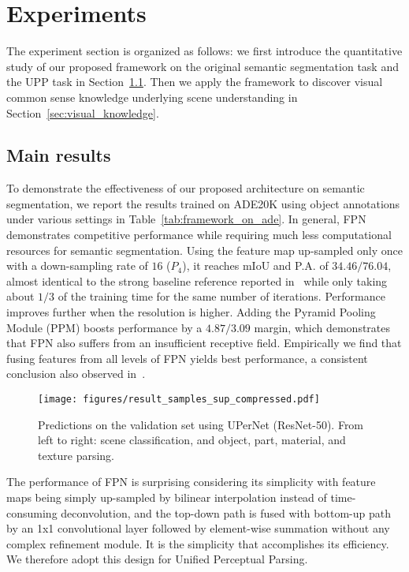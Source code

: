 \documentclass[runningheads]{llncs}
\begin{document}
\section{Experiments}
The experiment section is organized as follows: we first introduce the quantitative study of our proposed framework on the original semantic segmentation task and the UPP task in Section~\ref{sec:results}. Then we apply the framework to discover visual common sense knowledge underlying scene understanding in Section~\ref{sec:visual_knowledge}. 

\subsection{Main results}
\label{sec:results}

 To demonstrate the effectiveness of our proposed architecture on semantic segmentation, we report the results trained on ADE20K using object annotations under various settings in Table~\ref{tab:framework_on_ade}. In general, FPN demonstrates competitive performance while requiring much less computational resources for semantic segmentation. Using the feature map up-sampled only once with a down-sampling rate of $16$ ($P_4$), it reaches mIoU and P.A. of $34.46/76.04$, almost identical to the strong baseline reference reported in~\cite{zhao2017pyramid} while only taking about $1/3$ of the training time for the same number of iterations. Performance improves further when the resolution is higher. Adding the Pyramid Pooling Module (PPM) boosts performance by a $4.87/3.09$ margin, which demonstrates that FPN also suffers from an insufficient receptive field. Empirically we find that fusing features from all levels of FPN yields best performance, a consistent conclusion also observed in~\cite{fair2017cocoseg}. 


\begin{figure}[!t]
\centering
\texttt{[image: figures/result\_samples\_sup\_compressed.pdf]}
\caption{Predictions on the validation set using UPerNet (ResNet-50). From left to right: scene classification, and object, part, material, and texture parsing.}
\label{fig:visualization_samples}
\end{figure}

The performance of FPN is surprising considering its simplicity with feature maps being simply up-sampled by bilinear interpolation instead of time-consuming deconvolution, and the top-down path is fused with bottom-up path by an 1x1 convolutional layer followed by element-wise summation without any complex refinement module. It is the simplicity that accomplishes its efficiency. We therefore adopt this design for Unified Perceptual Parsing.
\end{document}

